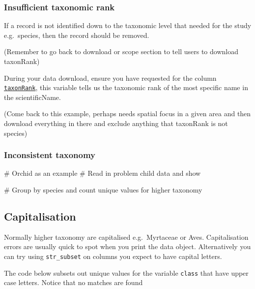 \documentclass[
  letterpaper,
  DIV=11,
  numbers=noendperiod,
  oneside]{scrreprt}
\newenvironment{Shaded}{\begin{snugshade}}{\end{snugshade}}
\newcommand{\CommentTok}[1]{\textcolor[rgb]{0.37,0.37,0.37}{#1}}
\begin{document}
\hypertarget{insufficient-taxonomic-rank}{%
\subsubsection*{Insufficient taxonomic
rank}\label{insufficient-taxonomic-rank}}

If a record is not identified down to the taxonomic level that needed
for the study e.g.~species, then the record should be removed.

(Remember to go back to download or scope section to tell users to
download taxonRank)

During your data download, ensure you have requested for the column
\href{https://dwc.tdwg.org/terms/\#dwc:taxonRank}{\texttt{taxonRank}},
this variable tells us the taxonomic rank of the most specific name in
the scientificName.

(Come back to this example, perhaps needs spatial focus in a given area
and then download everything in there and exclude anything that
taxonRank is not species)

\hypertarget{inconsistent-taxonomy}{%
\subsubsection{Inconsistent taxonomy}\label{inconsistent-taxonomy}}

\begin{Shaded}
\begin{Highlighting}[]
\CommentTok{\# Orchid as an example }
\CommentTok{\# Read in problem child data and show}

\CommentTok{\# Group by species and count unique values for higher taxonomy}
\end{Highlighting}
\end{Shaded}

\hypertarget{capitalisation}{%
\subsection{Capitalisation}\label{capitalisation}}

Normally higher taxonomy are capitalised e.g.~Myrtaceae or Aves.
Capitalisation errors are usually quick to spot when you print the data
object. Alternatively you can try using \texttt{str\_subset} on columns
you expect to have capital letters.

The code below subsets out unique values for the variable \texttt{class}
that have upper case letters. Notice that no matches are found
\end{document}
